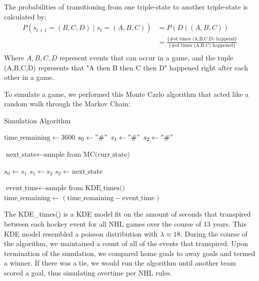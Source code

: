 \documentclass[11pt]{article}
\begin{document}
The probabilities of transitioning from one triple-state to another triple-state is calculated by:
\begin{align*}
    P(s_{t+1} = (B,C,D) \;|\; s_t = (A,B,C)) &= P(D \;|\; (A,B,C)) \\
    &= \frac{\{ \text{\# of times (A,B,C,D) happend}\}}{\{ \text{\# of times (A,B,C) happened}\}} \\
\end{align*}
Where $A,B,C,D$ represent events that can occur in a game, and the tuple (A,B,C,D) represents that "A then 
B then C then D" happened right after each other in a game.

To simulate a game, we performed this Monte Carlo algorithm that acted like a random walk through the Markov Chain:
\begin{algorithm}[H]
    \caption{Simulation Algorithm}
    \begin{algorithmic}[1]
        \State $\text{time\_remaining} \gets 3600$
        \State $s_0 \gets "\#"$
        \State $s_1 \gets "\#"$
        \State $s_2 \gets "\#"$

            \State $\text{next\_state} \gets \text{sample from } \text{MC(curr\_state)}$
            
            \State $s_0 \gets s_1$
            \State $s_1 \gets s_2$
            \State $s_2 \gets \text{next\_state}$

            \State $\text{event\_time} \gets \text{sample from } \text{KDE\_times()}$
            \State $\text{time\_remaining} \gets (\text{time\_remaining} - \text{event\_time})$
        \EndWhile
    \end{algorithmic}
    \label{alg:monte_carlo_algorithm}
\end{algorithm}
The KDE\_times() is a KDE model fit on the amount of seconds that transpired between each hockey event for all NHL games over the course of 13 years. This KDE model resembled a poisson distribution with $\lambda \approx 18$. During the course of the algorithm, we maintained a count of all of the events that transpired. Upon termination of the simulation, we compared home goals to away goals and termed a winner. If there was a tie, we would run the algorithm until another team scored a goal, thus simulating overtime per NHL rules.
\end{document}
